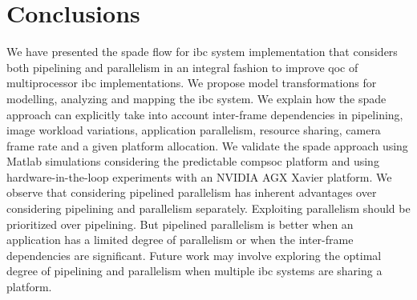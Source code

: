 \section{Conclusions}
\label{sec:ch7_conclusion}
We have presented the \gls{spade} flow for \gls{ibc} system implementation that considers both pipelining and parallelism in an integral fashion to improve \gls{qoc} of multiprocessor \gls{ibc} implementations. 
We propose model transformations for modelling, analyzing and mapping the \gls{ibc} system.
We explain how the \gls{spade} approach can explicitly take into account inter-frame dependencies in pipelining, image workload variations, application parallelism, resource sharing, camera frame rate and a given platform allocation. 
We validate the \gls{spade} approach using Matlab simulations considering the predictable \gls{compsoc} platform and using hardware-in-the-loop experiments with an NVIDIA AGX Xavier platform.
We observe that considering pipelined parallelism has inherent advantages over considering pipelining and parallelism separately. Exploiting parallelism should be prioritized over pipelining. But pipelined parallelism is better when an application has a limited degree of parallelism or when the inter-frame dependencies are significant.
Future work may involve exploring the optimal degree of pipelining and parallelism when multiple \gls{ibc} systems are sharing a platform.